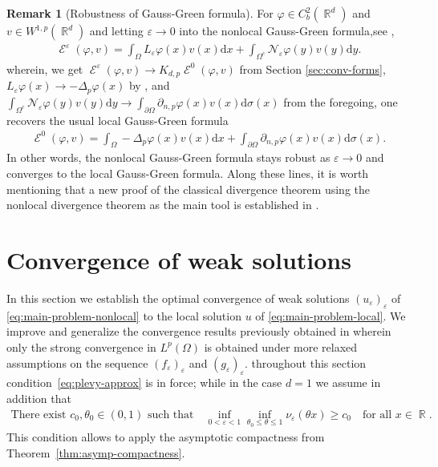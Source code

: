 \documentclass[12pt, reqno]{amsart}%
\theoremstyle{plain}  %
\theoremstyle{definition}  %
\newtheorem{remark}[theorem]{Remark}   %
\numberwithin{equation}{section}
\DeclareMathOperator{\cE}{\mathcal{E}}
\DeclareMathOperator{\R}{\mathbb{R}}
\renewcommand{\d}{\mathrm{d}}
\newcommand{\eps}{\varepsilon}
\begin{document}
\begin{remark}[Robustness of Gauss-Green formula]
 For $\varphi \in C^2_b(\R^d)$  and $v\in W^{1,p}(\R^d)$ and letting $\eps\to 0$ into the nonlocal Gauss-Green formula,see \cite[Theorem B.8]{Fog25},
\begin{align*}\tag{$G_\eps$}
\cE^\eps(\varphi, v)= \int_\Omega L_\eps \varphi(x)v(x)\d x+  \int_{\Omega^c}\mathcal{N}_\eps \varphi(y)v(y)\d y.
\end{align*}
wherein,  we get $\cE^\eps(\varphi, v)\to K_{d,p}\cE^0(\varphi, v)$ from Section \ref{sec:conv-forms},  $L_\eps \varphi (x)\to -\Delta_p\varphi(x)$ by \cite[Theorem 9.9]{Fog25}, and  $ \int_{\Omega^c}\mathcal{N}_\eps \varphi(y)v(y)\d y\to \int_{\partial \Omega}\partial_{n,p} \varphi(x)v(x)\d \sigma(x)$ from the foregoing, one recovers the usual local Gauss-Green formula
\begin{align*}\tag{$G_0$}
\cE^0 (\varphi, v)= \int_\Omega -\Delta_p \varphi(x)v(x)\d x+  \int_{\partial \Omega}\partial_{n,p} \varphi(x)v(x)\d \sigma(x).
\end{align*}
In other words, the nonlocal Gauss-Green formula  stays  robust as $\eps\to0$ and converges  to the local Gauss-Green formula. Along these lines, it is worth mentioning that a new proof of the classical divergence theorem using the nonlocal divergence theorem as the main tool is established in \cite{HK23}.
\end{remark}


\section{Convergence of weak solutions}\label{sec:conv-weak-solution}

In this section we establish the optimal convergence  of weak solutions $(u_\eps)_\eps$ of \eqref{eq:main-problem-nonlocal} to the local solution $u$ of \eqref{eq:main-problem-local}.  We improve and generalize the convergence results previously obtained in \cite{Fog25} wherein only the strong convergence in $L^p(\Omega)$ is obtained under more relaxed assumptions on the sequence $(f_\eps)_\eps$ and $(g_\eps)_\eps$. throughout this section condition~\eqref{eq:plevy-approx} is in force; while in the case $d=1$ we assume in addition that
\begin{align}\label{eq:ponce-one-dim-cond}
\text{There exist $c_0, \theta_0 \in (0,1)$ such that}
\quad
\inf_{0 < \varepsilon < 1} \inf_{\theta_0 \leq \theta \leq 1} \nu_\varepsilon(\theta x) \geq c_0
\quad \text{for all } x \in \R.
\end{align}
This condition allows  to apply the asymptotic compactness from Theorem~\ref{thm:asymp-compactness}.
\vspace{-1mm}
\end{document}
